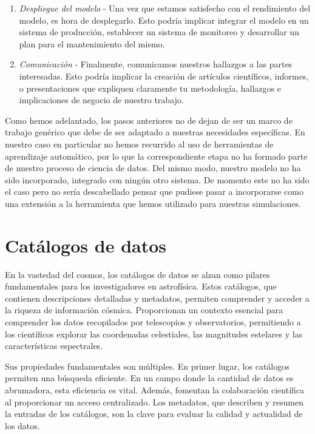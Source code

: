 \begin{enumerate}
	\item \textit{Despliegue del modelo} - Una vez que estamos satisfecho con el rendimiento del modelo, es hora de desplegarlo. Esto podría implicar integrar el modelo en un sistema de producción, establecer un sistema de monitoreo y desarrollar un plan para el mantenimiento del mismo.
	\item \textit{Comunicación} - Finalmente, comunicamos nuestros hallazgos a las partes interesadas. Esto podría implicar la creación de artículos científicos, informes, o presentaciones que expliquen claramente tu metodología, hallazgos e implicaciones de negocio de nuestro trabajo.
\end{enumerate}

Como hemos adelantado, los pasos anteriores no de dejan de ser un marco de trabajo genérico que debe de ser adaptado a nuestras necesidades específicas. En nuestro caso en particular no hemos recurrido al uso de herramientas de aprendizaje automático, por lo que la correspondiente etapa no ha formado parte de nuestro proceso de ciencia de datos. Del mismo modo, nuestro modelo no ha sido incorporado, integrado con ningún otro sistema. De momento este no ha sido el caso pero no sería descabellado pensar que pudiese pasar a incorporarse como una extensión a la herramienta que hemos utilizado para nuestras simulaciones.


\section{Catálogos de datos}
En la vastedad del cosmos, los catálogos de datos se alzan como pilares fundamentales para los investigadores en astrofísica. Estos catálogos, que contienen descripciones detalladas y metadatos, permiten comprender y acceder a la riqueza de información cósmica. Proporcionan un contexto esencial para comprender los datos recopilados por telescopios y observatorios, permitiendo a los científicos explorar las coordenadas celestiales, las magnitudes estelares y las características espectrales.\par

Sus propiedades fundamentales son múltiples. En primer lugar, los catálogos permiten una búsqueda eficiente. En un campo donde la cantidad de datos es abrumadora, esta eficiencia es vital. Además, fomentan la colaboración científica al proporcionar un acceso centralizado. Los metadatos, que describen y resumen la entradas de los catálogos, son la clave para evaluar la calidad y actualidad de los datos.\par

